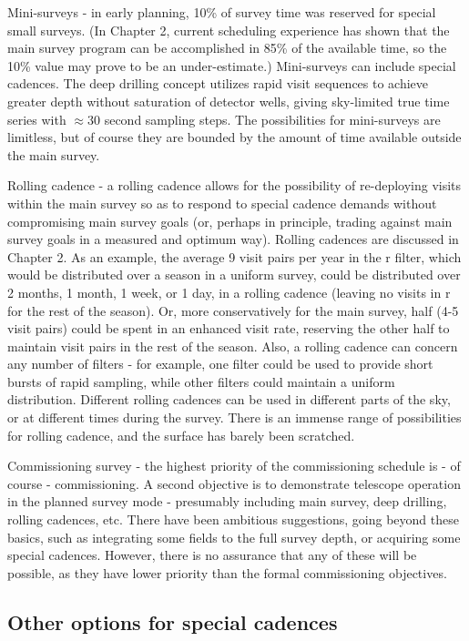 	Mini-surveys - in early planning, 10\% of survey time was reserved for special small surveys.  (In Chapter 2, current scheduling experience has shown that the main survey program can be accomplished in 85\% of the available time, so the 10\% value may prove to be an under-estimate.)  Mini-surveys can include special cadences. The deep drilling concept utilizes rapid visit sequences to achieve greater depth without saturation of detector wells, giving sky-limited true time series with $\approx$30 second sampling steps.  The possibilities for mini-surveys are limitless, but of course they are bounded by the amount of time available outside the main survey.
	
	Rolling cadence - a rolling cadence allows for the possibility of re-deploying visits within the main survey so as to respond to special cadence demands without compromising main survey goals (or, perhaps in principle, trading against main survey goals in a measured and optimum way). Rolling cadences are discussed in Chapter 2.  As an example, the average 9 visit pairs per year in the r filter, which would be distributed over a season in a uniform survey, could be distributed over 2 months, 1 month, 1 week, or 1 day, in a rolling cadence (leaving no visits in r for the rest of the season).  Or, more conservatively for the main survey, half (4-5 visit pairs) could be spent in an enhanced visit rate, reserving the other half to maintain visit pairs in the rest of the season.  Also, a rolling cadence can concern any number of filters - for example, one filter could be used to provide short bursts of rapid sampling, while other filters could maintain a uniform distribution.  Different rolling cadences can be used in different parts of the sky, or at different times during the survey.  There is an immense range of possibilities for rolling cadence, and the surface has barely been scratched.  
	
	Commissioning survey - the highest priority of the commissioning schedule is - of course - commissioning.  A second objective is to demonstrate telescope operation in the planned survey mode - presumably including main survey, deep drilling, rolling cadences, etc.  There have been ambitious suggestions, going beyond these basics, such as integrating some fields to the full survey depth, or acquiring some special cadences.  However, there is no assurance that any of these will be possible, as they have lower priority than the formal commissioning objectives.
	
\subsection{Other options for special cadences}
	
